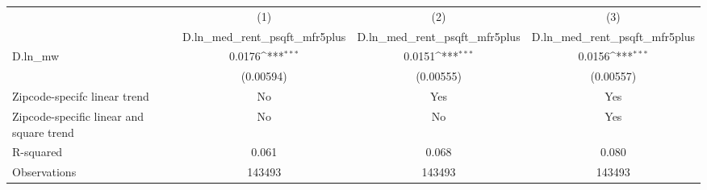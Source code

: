 {
\def\sym#1{\ifmmode^{#1}\else\(^{#1}\)\fi}
\begin{tabular}{l*{3}{c}}
\hline\hline
          &\multicolumn{1}{c}{(1)}&\multicolumn{1}{c}{(2)}&\multicolumn{1}{c}{(3)}\\
          &\multicolumn{1}{c}{D.ln\_med\_rent\_psqft\_mfr5plus}&\multicolumn{1}{c}{D.ln\_med\_rent\_psqft\_mfr5plus}&\multicolumn{1}{c}{D.ln\_med\_rent\_psqft\_mfr5plus}\\
\hline
D.ln\_mw   &   0.0176\sym{***}&   0.0151\sym{***}&   0.0156\sym{***}\\
          &(0.00594)         &(0.00555)         &(0.00557)         \\
\hline
Zipcode-specifc linear trend&       No         &      Yes         &      Yes         \\
Zipcode-specific linear and square trend&       No         &       No         &      Yes         \\
R-squared &    0.061         &    0.068         &    0.080         \\
Observations&   143493         &   143493         &   143493         \\
\hline\hline
\end{tabular}
}
